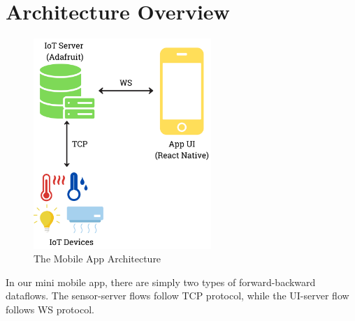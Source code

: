 \section{Architecture Overview}

\begin{figure}[ht]
  \centering
  \includegraphics[width=0.6\textwidth]{img/architecture.png}
  \vspace{0.25cm}
  \caption{The Mobile App Architecture}
\end{figure}

In our mini mobile app, there are simply two types of forward-backward dataflows. The sensor-server flows follow TCP protocol, while the UI-server flow follows WS protocol.

